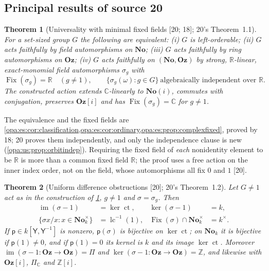 \documentclass[11pt,oneside]{article}
\numberwithin{equation}{section}
\newtheorem{theorem}{Theorem}[section]
\theoremstyle{definition}
\theoremstyle{remark}
\newcommand{\No}{\mathbf{No}}
\newcommand{\Oz}{\mathbf{Oz}}
\newcommand{\Og}{\mathbf{Oz}[i]}
\newcommand{\SC}{\mathbf{No}(i)}
\newcommand{\R}{\mathbb R}
\newcommand{\C}{\mathbb C}
\newcommand{\Z}{\mathbb Z}
\newcommand{\lc}{\operatorname{lc}}
\newcommand{\ct}{\operatorname{ct}}
\newcommand{\Fix}{\operatorname{Fix}}
\newcommand{\src}[1]{\textup{\textsf{\small[#1]}}}
\begin{document}
\subsection{Principal results of source 20}\label{opa:us:sub:results}

\begin{theorem}[Universality with minimal fixed fields \src{20; 18}; 20's Theorem~1.1]\label{opa:us:thm:main}
For a set-sized group $G$ the following are equivalent: \textup{(i)} $G$ is left-orderable; \textup{(ii)} $G$ acts faithfully by field
automorphisms on $\No$; \textup{(iii)} $G$ acts faithfully by ring automorphisms on $\Oz$; \textup{(iv)} $G$ acts faithfully on $(\No,\Oz)$
by strong, $\R$-linear, exact-monomial field automorphisms $\sigma_g$ with
\begin{equation}\label{opa:us:eq:main}
 \Fix(\sigma_g)=\R\quad(g\ne1),\qquad \{\sigma_g(\omega):g\in G\}\ \text{algebraically independent over }\R .
\end{equation}
The constructed action extends $\C$-linearly to $\SC$, commutes with conjugation, preserves $\Og$ and has $\Fix(\sigma_g)=\C$ for $g\ne1$.
\end{theorem}

The equivalence and the fixed fields are \cref{opa:es:cor:classification,opa:es:cor:ordinary,opa:es:prop:complexfixed}, proved by 18;
20 proves them independently, and only the independence clause is new (\cref{opa:us:prop:orbitindep}). Requiring the fixed field of
\emph{each} nonidentity element to be $\R$ is more than a common fixed field $\R$; the proof uses a free action on the inner index order,
not on the field, whose automorphisms all fix $0$ and $1$ \src{20}.

\begin{theorem}[Uniform difference obstructions \src{20}; 20's Theorem~1.2]\label{opa:us:thm:maindiff}
Let $G\ne1$ act as in the construction of \cref{opa:us:thm:main}, $g\ne1$ and $\sigma=\sigma_g$. Then
\begin{align}
 \operatorname{im}(\sigma-1)&=\ker\ct, & \ker(\sigma-1)&=k,\label{opa:us:eq:introadd}\\
 \{\sigma x/x:x\in\No_k^\times\}&=\lc^{-1}(1), & \Fix(\sigma)\cap\No_k^\times&=k^\times.\label{opa:us:eq:intromult}
\end{align}
If $\mathsf p\in k[\mathsf Y,\mathsf Y^{-1}]$ is nonzero, $\mathsf p(\sigma)$ is bijective on $\ker\ct$; on $\No_k$ it is bijective if $\mathsf p(1)\ne0$,
and if $\mathsf p(1)=0$ its kernel is $k$ and its image $\ker\ct$. Moreover $\operatorname{im}(\sigma-1:\Oz\to\Oz)=\Pi$ and $\ker(\sigma-1:\Oz\to\Oz)=\Z$, and
likewise with $\Og$, $\Pi_\C$ and $\Z[i]$.
\end{theorem}
\end{document}
